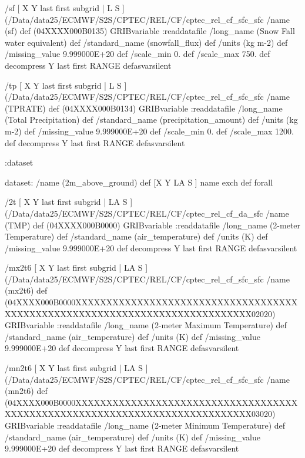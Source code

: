 \begin{ingrid}
{/sf { [ X Y last first subgrid | L S ] (/Data/data25/ECMWF/S2S/CPTEC/REL/CF/cptec_rel_cf_sfc_sfc%
  /name (sf) def
  (04XXXX000B0135) GRIBvariable
  :readdatafile
  /long_name (Snow Fall water equivalent) def
  /standard_name (snowfall_flux) def
  /units (kg m-2) def
  /missing_value 9.999000E+20 def
  /scale_min 0. def
  /scale_max 750. def
  decompress
  Y last first RANGE
} defasvarsilent

/tp { [ X Y last first subgrid | L S ] (/Data/data25/ECMWF/S2S/CPTEC/REL/CF/cptec_rel_cf_sfc_sfc%
  /name (TPRATE) def
  (04XXXX000B0134) GRIBvariable
  :readdatafile
  /long_name (Total Precipitation) def
  /standard_name (precipitation_amount) def 
  /units (kg m-2) def
  /missing_value 9.999000E+20 def
  /scale_min 0. def
  /scale_max 1200. def
  decompress
  Y last first RANGE
} defasvarsilent

:dataset

dataset:
/name (2m_above_ground) def
[X Y LA S ] {name exch def } forall

/2t { [ X Y last first subgrid | LA S ] (/Data/data25/ECMWF/S2S/CPTEC/REL/CF/cptec_rel_cf_da_sfc%
  /name (TMP) def
  (04XXXX000B0000) GRIBvariable
  :readdatafile
  /long_name (2-meter Temperature) def
  /standard_name (air_temperature) def
  /units (K) def
  /missing_value 9.999000E+20 def
  decompress
  Y last first RANGE
} defasvarsilent

/mx2t6 { [ X Y last first subgrid | LA S ] (/Data/data25/ECMWF/S2S/CPTEC/REL/CF/cptec_rel_cf_sfc_sfc%
  /name (mx2t6) def
  (04XXXX000B0000XXXXXXXXXXXXXXXXXXXXXXXXXXXXXXXXXXXXXXXXXXXXXXXXXXXXXXXXXXXXXXXXXXXXXXXXXXXX02020) GRIBvariable
  :readdatafile
  /long_name (2-meter Maximum Temperature) def
  /standard_name (air_temperature) def
  /units (K) def
  /missing_value 9.999000E+20 def
  decompress
  Y last first RANGE
} defasvarsilent

/mn2t6 { [ X Y last first subgrid | LA S ] (/Data/data25/ECMWF/S2S/CPTEC/REL/CF/cptec_rel_cf_sfc_sfc%
  /name (mn2t6) def
  (04XXXX000B0000XXXXXXXXXXXXXXXXXXXXXXXXXXXXXXXXXXXXXXXXXXXXXXXXXXXXXXXXXXXXXXXXXXXXXXXXXXXX03020) GRIBvariable
  :readdatafile
  /long_name (2-meter Minimum Temperature) def
  /standard_name (air_temperature) def
  /units (K) def
  /missing_value 9.999000E+20 def
  decompress
  Y last first RANGE
} defasvarsilent

}
\end{ingrid}
